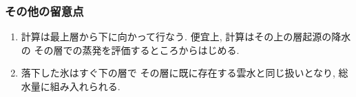 \subsubsection{その他の留意点}

\begin{enumerate}
\item 計算は最上層から下に向かって行なう.
      便宜上, 計算はその上の層起源の降水の
      その層での蒸発を評価するところからはじめる.
\item 落下した氷はすぐ下の層で
      その層に既に存在する雲水と同じ扱いとなり,
      総水量に組み入れられる.
\end{enumerate}



